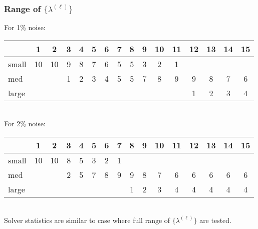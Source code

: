 \documentclass[12pt,t,xcolor=dvipsnames]{beamer}
\begin{document}
\begin{frame}
\frametitle{Range of $\{\lambda^{(\ell)}\}$}

For 1\% noise: \ \\[12pt]

\setlength\tabcolsep{5pt}
  \begin{tabular}{l|ccccc|ccccc|ccccc}
     & 1 & 2 & 3 & 4 & 5 & 6 & 7 & 8 & 9 & 10 & 11 & 12 & 13 & 14
    & 15 \\
    \hline
    small & 10  &  10   &  9 &    8  &   7&     6  &   5 &   5 &    3    & 2 &    1   &    &        &    &    \\
    med   &     &      &  1   &  2  &   3  &   4  &   5  &   5  &   7   &  8  &   9  &   9  &   8  &   7  &   6\\
    large &     &     &        &   &        &    &        &      &  
    &       &    &    1   &  2 &    3   &  4\\
    \end{tabular}

\ \\[6pt]
For 2\% noise: \ \\[12pt]

\setlength\tabcolsep{5pt}
  \begin{tabular}{l|ccccc|ccccc|ccccc}
     & 1 & 2 & 3 & 4 & 5 & 6 & 7 & 8 & 9 & 10 & 11 & 12 & 13 & 14
    & 15 \\
    \hline
    small & 10 &   10  &   8 &    5   &  3 &    2   &  1 &        &    &        &    &        &    &        &  \\
    med   &     &     &    2  &   5  &   7  &   8  &   9  &   9  &   8  &   7  &   6  &   6  &   6  &   6  &   6\\
    large &      &   &         &    &        &    &        &  1 &    2   &  3 &    4   &  4 &    4   &  4 &    4\\
  \end{tabular}

  \ \\[6pt]

  Solver statistics are similar to case where full range of
  $\{\lambda^{(\ell)}\}$ are tested.
\end{frame}
\end{document}
